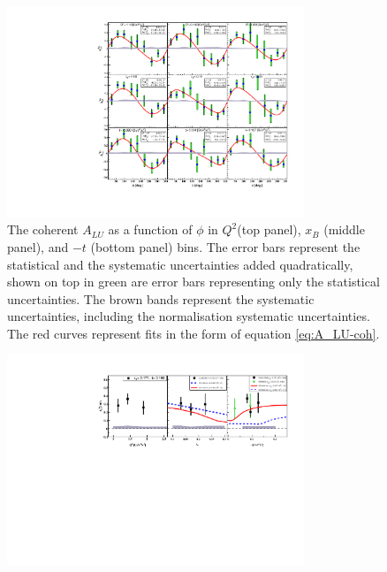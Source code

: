\documentclass[nofootinbib,twocolumn,showpacs,prl,superscriptaddress,secnumarabic,amssymb,nobibnotes,aps,floatfix]{revtex4}
\begin{document}
\begin{figure}[tb]
\includegraphics[width=8.9cm]{figs/coherent-ALU.pdf}
\caption{The coherent $A_{LU}$ as a function of $\phi$ in
   $Q^{2}$(top panel), $x_{B}$ (middle panel), and $-t$ (bottom panel) bins.  
   The error bars represent the statistical and the systematic uncertainties 
   added quadratically, shown on top in green are error bars representing only 
   the statistical uncertainties. The brown bands represent the systematic
uncertainties, including the normalisation systematic uncertainties. The red
curves represent fits in the form of equation \ref{eq:A_LU-coh}.}
\label{fig:alu}
\end{figure}

\begin{figure}[tb]
\includegraphics[width=8.9cm]{figs/coherent-ALU_90.pdf}
\vspace{-0.9cm}
\caption{}
\label{fig:alu90}
\end{figure}
\end{document}
